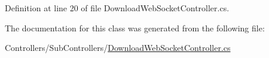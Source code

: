 Definition at line 20 of file Download\+Web\+Socket\+Controller.\+cs.



The documentation for this class was generated from the following file\+:\begin{DoxyCompactItemize}
\item 
Controllers/\+Sub\+Controllers/\mbox{\hyperlink{_download_web_socket_controller_8cs}{Download\+Web\+Socket\+Controller.\+cs}}\end{DoxyCompactItemize}
